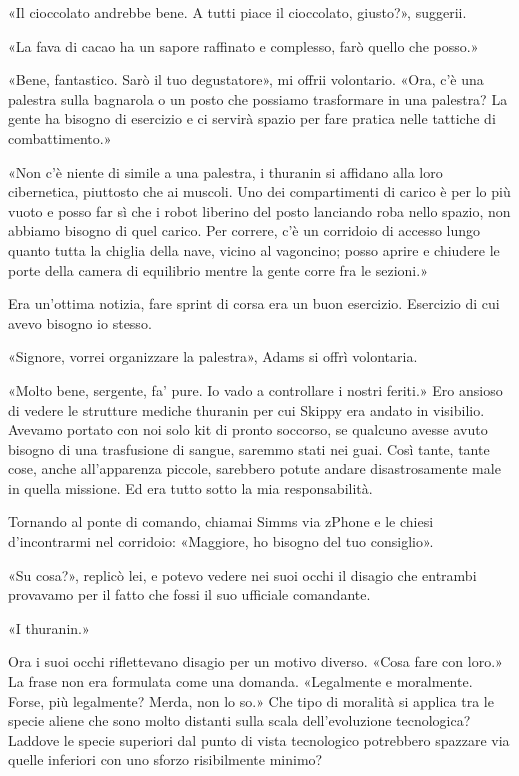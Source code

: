 «Il cioccolato andrebbe bene. A tutti piace il cioccolato, giusto?»,
suggerii.

«La fava di cacao ha un sapore raffinato e complesso, farò quello che
posso.»

«Bene, fantastico. Sarò il tuo degustatore», mi offrii volontario. «Ora,
c'è una palestra sulla bagnarola o un posto che possiamo trasformare in
una palestra? La gente ha bisogno di esercizio e ci servirà spazio per
fare pratica nelle tattiche di combattimento.»

«Non c'è niente di simile a una palestra, i thuranin si affidano alla
loro cibernetica, piuttosto che ai muscoli. Uno dei compartimenti di
carico è per lo più vuoto e posso far sì che i robot liberino del posto
lanciando roba nello spazio, non abbiamo bisogno di quel carico. Per
correre, c'è un corridoio di accesso lungo quanto tutta la chiglia della
nave, vicino al vagoncino; posso aprire e chiudere le porte della camera
di equilibrio mentre la gente corre fra le sezioni.»

Era un'ottima notizia, fare sprint di corsa era un buon esercizio.
Esercizio di cui avevo bisogno io stesso.

«Signore, vorrei organizzare la palestra», Adams si offrì volontaria.

«Molto bene, sergente, fa' pure. Io vado a controllare i nostri feriti.»
Ero ansioso di vedere le strutture mediche thuranin per cui Skippy era
andato in visibilio. Avevamo portato con noi solo kit di pronto
soccorso, se qualcuno avesse avuto bisogno di una trasfusione di sangue,
saremmo stati nei guai. Così tante, tante cose, anche all'apparenza
piccole, sarebbero potute andare disastrosamente male in quella
missione. Ed era tutto sotto la mia responsabilità.

\hfill\break

Tornando al ponte di comando, chiamai Simms via zPhone e le chiesi
d'incontrarmi nel corridoio: «Maggiore, ho bisogno del tuo consiglio».

«Su cosa?», replicò lei, e potevo vedere nei suoi occhi il disagio che
entrambi provavamo per il fatto che fossi il suo ufficiale comandante.

«I thuranin.»

Ora i suoi occhi riflettevano disagio per un motivo diverso. «Cosa fare
con loro.» La frase non era formulata come una domanda. «Legalmente e
moralmente. Forse, più legalmente? Merda, non lo so.» Che tipo di
moralità si applica tra le specie aliene che sono molto distanti sulla
scala dell'evoluzione tecnologica? Laddove le specie superiori dal punto
di vista tecnologico potrebbero spazzare via quelle inferiori con uno
sforzo risibilmente minimo?

